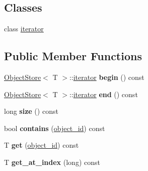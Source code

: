 \subsection*{Classes}
\begin{DoxyCompactItemize}
\item 
class \hyperlink{classmlnet_1_1_object_store_1_1iterator}{iterator}
\end{DoxyCompactItemize}
\subsection*{Public Member Functions}
\begin{DoxyCompactItemize}
\item 
\hypertarget{structmlnet_1_1_object_store_ad635d2fb101dd349c02f248b9e4094e5}{\hyperlink{structmlnet_1_1_object_store}{Object\+Store}$<$ T $>$\+::\hyperlink{classmlnet_1_1_object_store_1_1iterator}{iterator} {\bfseries begin} () const }\label{structmlnet_1_1_object_store_ad635d2fb101dd349c02f248b9e4094e5}

\item 
\hypertarget{structmlnet_1_1_object_store_ae06c5f38a96a6b9aa1419a04615f3c23}{\hyperlink{structmlnet_1_1_object_store}{Object\+Store}$<$ T $>$\+::\hyperlink{classmlnet_1_1_object_store_1_1iterator}{iterator} {\bfseries end} () const }\label{structmlnet_1_1_object_store_ae06c5f38a96a6b9aa1419a04615f3c23}

\item 
\hypertarget{structmlnet_1_1_object_store_a4f952791eff5273fa7af9e638dc76ea3}{long {\bfseries size} () const }\label{structmlnet_1_1_object_store_a4f952791eff5273fa7af9e638dc76ea3}

\item 
\hypertarget{structmlnet_1_1_object_store_a94a618f60ea6e89c3cad32dffacb824b}{bool {\bfseries contains} (\hyperlink{namespacemlnet_a318fc9bfdb74e1da4d44d0c50d4a453d}{object\+\_\+id}) const }\label{structmlnet_1_1_object_store_a94a618f60ea6e89c3cad32dffacb824b}

\item 
\hypertarget{structmlnet_1_1_object_store_a771c037dc66f82621f0586ce6c7da4cd}{T {\bfseries get} (\hyperlink{namespacemlnet_a318fc9bfdb74e1da4d44d0c50d4a453d}{object\+\_\+id}) const }\label{structmlnet_1_1_object_store_a771c037dc66f82621f0586ce6c7da4cd}

\item 
\hypertarget{structmlnet_1_1_object_store_a619008d0ae0704bcaf75679de6ad3ce9}{T {\bfseries get\+\_\+at\+\_\+index} (long) const }\label{structmlnet_1_1_object_store_a619008d0ae0704bcaf75679de6ad3ce9}


\end{DoxyCompactItemize}
